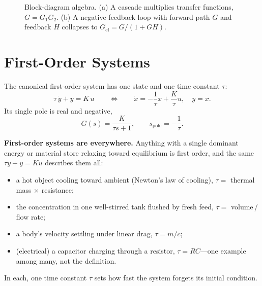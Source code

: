 \begin{figure}[htbp]
\centering
{}
\caption{Block-diagram algebra. (a) A cascade multiplies transfer functions,
\(G=G_1G_2\). (b) A negative-feedback loop with forward path \(G\) and feedback
\(H\) collapses to \(G_{\mathrm{cl}}=G/(1+GH)\).}
\label{fig:blocks}
\end{figure}

\section{First-Order Systems}
The canonical first-order system has one state and one time constant \(\tau\):
\[
\tau\,\dot{y}+y=K\,u
\qquad\Longleftrightarrow\qquad
\dot{x}=-\frac{1}{\tau}x+\frac{K}{\tau}u,\quad y=x .
\]
Its single pole is real and negative,
\[
G(s)=\frac{K}{\tau s+1},
\qquad
s_{\text{pole}}=-\frac{1}{\tau}.
\]

\begin{physicalbox}
\textbf{First-order systems are everywhere.} Anything with a single dominant
energy or material store relaxing toward equilibrium is first order, and the same
\(\tau\dot y+y=Ku\) describes them all:
\begin{itemize}
\item a hot object cooling toward ambient (Newton's law of cooling), \(\tau=\)
thermal mass \(\times\) resistance;
\item the concentration in one well-stirred tank flushed by fresh feed,
\(\tau=\) volume\,/\,flow rate;
\item a body's velocity settling under linear drag, \(\tau=m/c\);
\item (electrical) a capacitor charging through a resistor, \(\tau=RC\)---one
example among many, not the definition.
\end{itemize}
In each, one time constant \(\tau\) sets how fast the system forgets its initial
condition.
\end{physicalbox}

